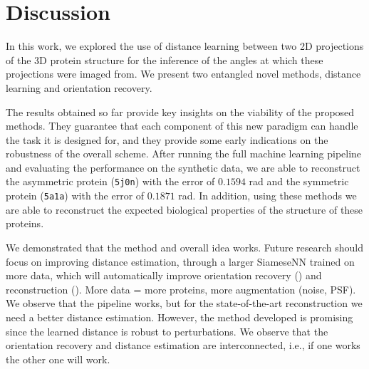 \section{Discussion}



 In this work, we explored the use of distance learning between two 2D projections of the 3D protein structure for the inference of the angles at which these projections were imaged from.
We present two entangled novel methods, distance learning and orientation recovery.

The results obtained so far provide key insights on the viability of the proposed methods.
They guarantee that each component of this new paradigm can handle the task it is designed for, and they provide some early indications on the robustness of the overall scheme.
After running the full machine learning pipeline and evaluating the performance on the synthetic data, we are able to reconstruct the asymmetric protein (\texttt{5j0n}) with the error of $0.1594$ rad and the symmetric protein (\texttt{5a1a}) with the error of $0.1871$ rad.
In addition, using these methods we are able to reconstruct the expected biological properties of the structure of these proteins.

We demonstrated that the method and overall idea works. Future research should focus on improving distance estimation, through a larger SiameseNN trained on more data, which will automatically improve orientation recovery () and reconstruction ().
More data = more proteins, more augmentation (noise, PSF).
We observe that the pipeline works, but for the state-of-the-art reconstruction we need a better distance estimation.
However, the method developed is promising since the learned distance is robust to perturbations.
We observe that the orientation recovery and distance estimation are interconnected, i.e., if one works the other one will work.

